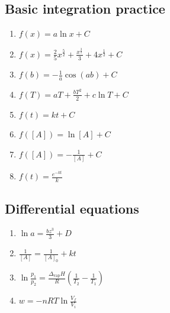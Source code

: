 \documentclass[
]{book}
\providecommand{\tightlist}{%
  \setlength{\itemsep}{0pt}\setlength{\parskip}{0pt}}
\begin{document}
\hypertarget{basic-integration-practice-1}{%
\subsection{Basic integration practice}\label{basic-integration-practice-1}}

\begin{enumerate}
\def\labelenumi{\arabic{enumi}.}
\tightlist
\item
  \(f (x) = a \ln x + C\)
\item
  \(f(x) = \frac{2}{5} x^{\frac{5}{2}}+ \frac{x^{\frac{3}{2}}}{3}+4x^{\frac{1}{2}}+C\)
\item
  \(f(b) =-\frac{1}{a}\cos (ab) + C\)
\item
  \(f(T) = aT + \frac{bT^2}{2} + c\ln T + C\)
\item
  \(f(t) = kt +C\)
\item
  \(f([A])= \ln [A] + C\)
\item
  \(f([A])=-\frac{1}{[A]}+ C\)
\item
  \(f(t) = \frac{e^{-kt}}{k}\)
\end{enumerate}

\hypertarget{differential-equations-1}{%
\subsection{Differential equations}\label{differential-equations-1}}

\begin{enumerate}
\def\labelenumi{\arabic{enumi}.}
\tightlist
\item
  \(\ln a = \frac{bz^3}{3}+D\)
\item
  \(\frac{1}{[A]}=\frac{1}{[A]_0}+ kt\)
\item
  \(\ln \frac{p_1}{p_2}=\frac{\Delta_{\textrm{vap}}H}{R}\left({\frac{1}{T_2}-\frac{1}{T_1}}\right)\)
\item
  \(w = -nRT \ln \frac{V_f}{V_i}\)
\end{enumerate}

  
\end{document}
